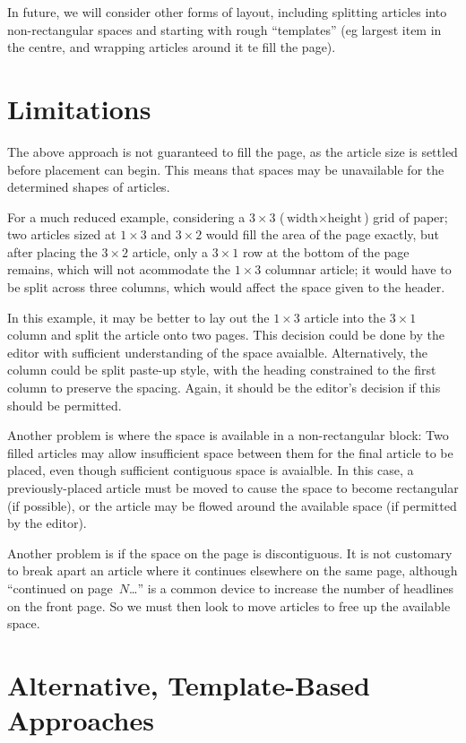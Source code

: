 \documentclass[a4paper]{scrartcl}
\begin{document}
In future, we will consider other forms of layout, including splitting
articles into non-rectangular spaces and starting with rough
``templates'' (eg largest item in the centre, and wrapping articles
around it te fill the page).

\section*{Limitations}

The above approach is not guaranteed to fill the page, as the article
size is settled before placement can begin. This means that spaces may
be unavailable for the determined shapes of articles.

For a much reduced example, considering a $3 \times 3$ ($\mbox{width}
\times \mbox{height}$) grid of paper; two articles sized at $1 \times 3$ and
$3 \times 2$ would fill the area of the page exactly, but after placing the
$3 \times 2$ article, only a $3 \times 1$ row at the bottom of the page remains,
which will not acommodate the $1 \times 3$ columnar article; it would have to
be split across three columns, which would affect the space given to
the header.

In this example, it may be better to lay out the $1 \times 3$ article into
the $3 \times 1$ column and split the article onto two pages. This decision
could be done by the editor with sufficient understanding of the space
avaialble. Alternatively, the column could be split paste-up style,
with the heading constrained to the first column to preserve the
spacing. Again, it should be the editor's decision if this should be
permitted.

Another problem is where the space is available in a non-rectangular
block: Two filled articles may allow insufficient space between them
for the final article to be placed, even though sufficient contiguous
space is avaialble. In this case, a previously-placed article must be
moved to cause the space to become rectangular (if possible), or the
article may be flowed around the available space (if permitted by the
editor).

Another problem is if the space on the page is discontiguous. It is
not customary to break apart an article where it continues elsewhere
on the same page, although ``continued on page~$N$\dots'' is a common
device to increase the number of headlines on the front page. So we
must then look to move articles to free up the available space.


\section{Alternative, Template-Based Approaches}
\end{document}
